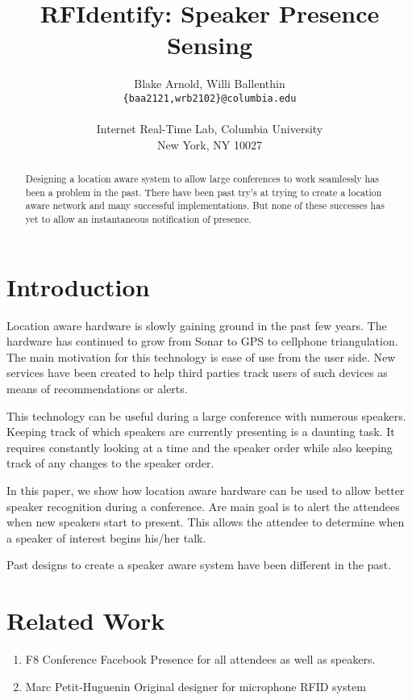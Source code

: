 \documentclass{article}
\title{RFIdentify: Speaker Presence Sensing}
\author{Blake Arnold, Willi Ballenthin\\
{\tt\{baa2121,wrb2102\}@columbia.edu}\\
\\
Internet Real-Time Lab, Columbia University\\
New York, NY 10027\\
}
\begin{document}
\makecover
\maketitle

\begin{abstract}

Designing a location aware system to allow large conferences to work seamlessly has been a problem in the past. There have been past try's at trying to create a location aware network and many successful implementations. But none of these successes has yet to allow an instantaneous notification of presence.

\end{abstract}


\section{Introduction} 

Location aware hardware is slowly gaining ground in the past few years. The hardware has continued to grow from Sonar to GPS to cellphone triangulation. The main motivation for this technology is ease of use from the user side. New services have been created to help third parties track users of such devices as means of recommendations or alerts.

This technology can be useful during a large conference with numerous speakers. Keeping track of which speakers are currently presenting is a daunting task. It requires constantly looking at a time and the speaker order while also keeping track of any changes to the speaker order.

In this paper, we show how location aware hardware can be used to allow better speaker recognition during a conference. Are main goal is to alert the attendees when new speakers start to present. This allows the attendee to determine when a speaker of interest begins his/her talk.

Past designs to create a speaker aware system have been different in the past.


\section{Related Work}

\begin{enumerate}
\item F8 Conference
Facebook Presence for all attendees as well as speakers.

\item Marc Petit-Huguenin
Original designer for microphone RFID system
\end{enumerate}
\end{document}
